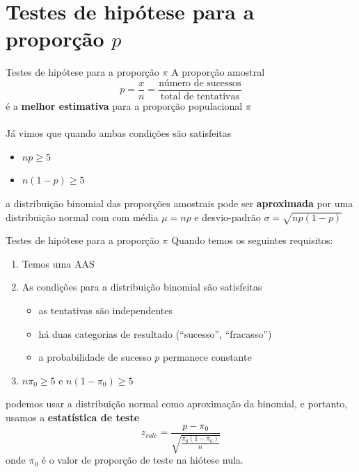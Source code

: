 \documentclass[10pt]{beamer}\usepackage[]{graphicx}\usepackage[]{color}
\theoremstyle{definition}
\begin{document}
\section{Testes de hipótese para a proporção $p$}

\begin{frame}{Testes de hipótese para a proporção $\pi$}
  A proporção amostral
  \begin{equation*}
    p = \frac{x}{n} = \frac{\text{número de sucessos}}{\text{total de
        tentativas}}
  \end{equation*}
  é a \textbf{melhor estimativa} para a proporção populacional $\pi$
  \\~\\
  Já vimos que quando ambas condições são satisfeitas
  \begin{itemize}
  \item $np \geq 5$
  \item $n(1-p) \geq 5$
  \end{itemize}
  a distribuição binomial das proporções amostrais pode ser
  \textbf{aproximada} por uma distribuição normal com com média $\mu =
  np$ e desvio-padrão $\sigma = \sqrt{np(1-p)}$
\end{frame}

\begin{frame}{Testes de hipótese para a proporção $\pi$}
  Quando temos os seguintes requisitos:
  \begin{enumerate}
  \item Temos uma AAS
  \item As condições para a distribuição binomial são satisfeitas
    \begin{itemize}
    \item as tentativas são independentes
    \item há duas categorias de resultado (``sucesso'', ``fracasso'')
    \item a probabilidade de sucesso $p$ permanece constante
    \end{itemize}
  \item $n\pi_0 \geq 5$ e $n(1-\pi_0) \geq 5$
  \end{enumerate}
  podemos usar a distribuição normal como aproximação da binomial, e
  portanto, usamos a \textbf{estatística de teste}
  \begin{equation*}
    z_{calc} = \frac{p - \pi_0}{\sqrt{\frac{\pi_0(1-\pi_0)}{n}}}
  \end{equation*}
  onde $\pi_0$ é o valor de proporção de teste na hiótese nula.
\end{frame}
\end{document}
